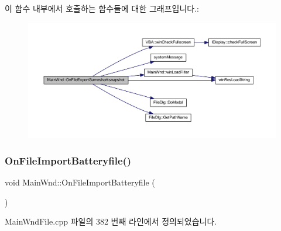 이 함수 내부에서 호출하는 함수들에 대한 그래프입니다.\+:
\nopagebreak
\begin{figure}[H]
\begin{center}
\leavevmode
\includegraphics[width=350pt]{class_main_wnd_ae567674cd79ab30eb420af2f91f5688c_cgraph}
\end{center}
\end{figure}
\mbox{\label{class_main_wnd_abea55fe16d21636d4c8704dd1fdfcfe9}} 
\subsubsection{\texorpdfstring{On\+File\+Import\+Batteryfile()}{OnFileImportBatteryfile()}}
{\footnotesize\ttfamily void Main\+Wnd\+::\+On\+File\+Import\+Batteryfile (\begin{DoxyParamCaption}{ }\end{DoxyParamCaption})\hspace{0.3cm}{\ttfamily [protected]}}



Main\+Wnd\+File.\+cpp 파일의 382 번째 라인에서 정의되었습니다.


